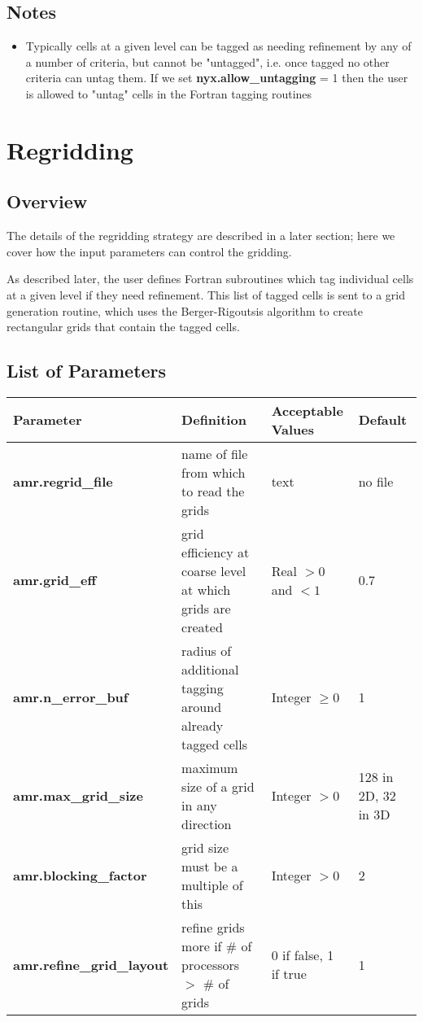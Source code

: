 \subsection{Notes}

\begin{itemize}
\item Typically cells at a given level can be tagged as needing refinement by any of a number
of criteria, but cannot be "untagged", i.e. once tagged no other criteria can untag them.   If
we set {\bf nyx.allow\_untagging} = 1 then the user is allowed to "untag" cells in the
Fortran tagging routines
\end{itemize}

\section{Regridding}
\subsection{Overview}

The details of the regridding strategy are described in a later section; here we 
cover how the input parameters can control the gridding.

As described later, the user defines Fortran subroutines which tag individual
cells at a given level if they need refinement.  This list of tagged cells is
sent to a grid generation routine, which uses the Berger-Rigoutsis algorithm
to create rectangular grids that contain the tagged cells.   

\subsection{List of Parameters}

\begin{table*}[h]
\begin{scriptsize}
\begin{center}
\begin{tabular}{|l|l|l|l|} \hline
Parameter & Definition & Acceptable Values &Default\\
\hline
{\bf amr.regrid\_file} & name of file from which to read the grids & text & no file  \\ 
{\bf amr.grid\_eff} & grid efficiency at coarse level at which grids are created & Real $>0$ and $<1$ & 0.7 \\ 
{\bf amr.n\_error\_buf} & radius of additional tagging around already tagged cells & Integer $\geq 0$ & 1 \\ 
{\bf amr.max\_grid\_size} & maximum size of a grid in any direction & Integer $> 0$ & 128 in 2D, 32 in 3D \\ 
{\bf amr.blocking\_factor} &  grid size must be a multiple of this & Integer $> 0$ & 2\\
{\bf amr.refine\_grid\_layout} & refine grids more if \# of processors $>$ \# of grids &  0 if false, 1 if true & 1 \\
\hline
\end{tabular}
\label{Table:GriddingInputs}
\end{center}
\end{scriptsize}
\end{table*}

